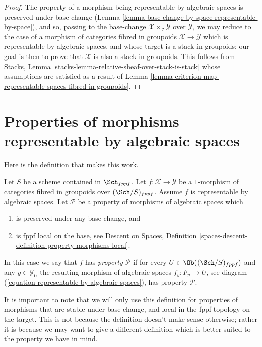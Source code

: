 \begin{proof}
The property of a morphism being representable by algebraic spaces
is preserved under base-change
(Lemma \ref{lemma-base-change-by-space-representable-by-space}),
and so, passing to the base-change
$\mathcal{X} \times_\mathcal{Z} \mathcal{Y}$ over $\mathcal{Y}$,
we may reduce to the case of a morphism of categories
fibred in groupoids $\mathcal{X} \to \mathcal{Y}$
which is representable by algebraic spaces, and
whose target is a stack in groupoids; our goal is then to prove
that $\mathcal{X}$ is also a stack in groupoids.
This follows from Stacks, Lemma
\ref{stacks-lemma-relative-sheaf-over-stack-is-stack}
whose assumptions are satisfied as a result of
Lemma \ref{lemma-criterion-map-representable-spaces-fibred-in-groupoids}.
\end{proof}







\section{Properties of morphisms representable by algebraic spaces}
\label{section-representable-properties}

\noindent
Here is the definition that makes this work.

\begin{definition}
\label{definition-relative-representable-property}
Let $S$ be a scheme contained in $\Sch_{fppf}$.
Let $f : \mathcal{X} \to \mathcal{Y}$ be a $1$-morphism
of categories fibred in groupoids over $(\Sch/S)_{fppf}$.
Assume $f$ is representable by algebraic spaces.
Let $\mathcal{P}$ be a property of morphisms of algebraic spaces which
\begin{enumerate}
\item is preserved under any base change, and
\item is fppf local on the base, see
Descent on Spaces,
Definition \ref{spaces-descent-definition-property-morphisms-local}.
\end{enumerate}
In this case we say that $f$ has {\it property $\mathcal{P}$} if for every
$U \in \Ob((\Sch/S)_{fppf})$ and
any $y \in \mathcal{Y}_U$ the resulting morphism of algebraic spaces
$f_y : F_y \to U$, see
diagram (\ref{equation-representable-by-algebraic-spaces}),
has property $\mathcal{P}$.
\end{definition}

\noindent
It is important to note that we will only use this definition for
properties of morphisms that are stable under base change, and
local in the fppf topology on the target. This is
not because the definition doesn't make sense otherwise; rather it
is because we may want to give a different definition which is
better suited to the property we have in mind.

